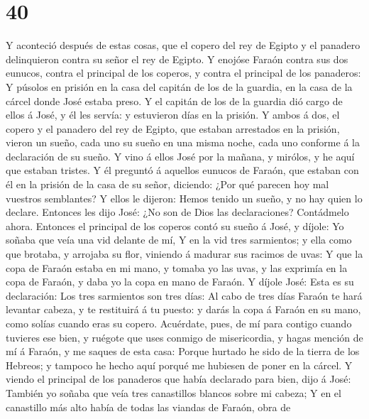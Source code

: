 \hypertarget{section-39}{%
\section{40}\label{section-39}}

 Y aconteció después de estas cosas, que el copero del rey
de Egipto y el panadero delinquieron contra su señor el rey de Egipto.
 Y enojóse Faraón contra sus dos eunucos, contra el
principal de los coperos, y contra el principal de los panaderos:
 Y púsolos en prisión en la casa del capitán de los de la
guardia, en la casa de la cárcel donde José estaba preso.  Y
el capitán de los de la guardia dió cargo de ellos á José, y él les
servía: y estuvieron días en la prisión.  Y ambos á dos, el
copero y el panadero del rey de Egipto, que estaban arrestados en la
prisión, vieron un sueño, cada uno su sueño en una misma noche, cada uno
conforme á la declaración de su sueño.  Y vino á ellos José
por la mañana, y mirólos, y he aquí que estaban tristes.  Y
él preguntó á aquellos eunucos de Faraón, que estaban con él en la
prisión de la casa de su señor, diciendo: ¿Por qué parecen hoy mal
vuestros semblantes?  Y ellos le dijeron: Hemos tenido un
sueño, y no hay quien lo declare. Entonces les dijo José: ¿No son de
Dios las declaraciones? Contádmelo ahora.  Entonces el
principal de los coperos contó su sueño á José, y díjole: Yo soñaba que
veía una vid delante de mí,  Y en la vid tres sarmientos; y
ella como que brotaba, y arrojaba su flor, viniendo á madurar sus
racimos de uvas:  Y que la copa de Faraón estaba en mi
mano, y tomaba yo las uvas, y las exprimía en la copa de Faraón, y daba
yo la copa en mano de Faraón.  Y díjole José: Esta es su
declaración: Los tres sarmientos son tres días:  Al cabo de
tres días Faraón te hará levantar cabeza, y te restituirá á tu puesto: y
darás la copa á Faraón en su mano, como solías cuando eras su copero.
 Acuérdate, pues, de mí para contigo cuando tuvieres ese
bien, y ruégote que uses conmigo de misericordia, y hagas mención de mí
á Faraón, y me saques de esta casa:  Porque hurtado he sido
de la tierra de los Hebreos; y tampoco he hecho aquí porqué me hubiesen
de poner en la cárcel.  Y viendo el principal de los
panaderos que había declarado para bien, dijo á José: También yo soñaba
que veía tres canastillos blancos sobre mi cabeza;  Y en el
canastillo más alto había de todas las viandas de Faraón, obra de
